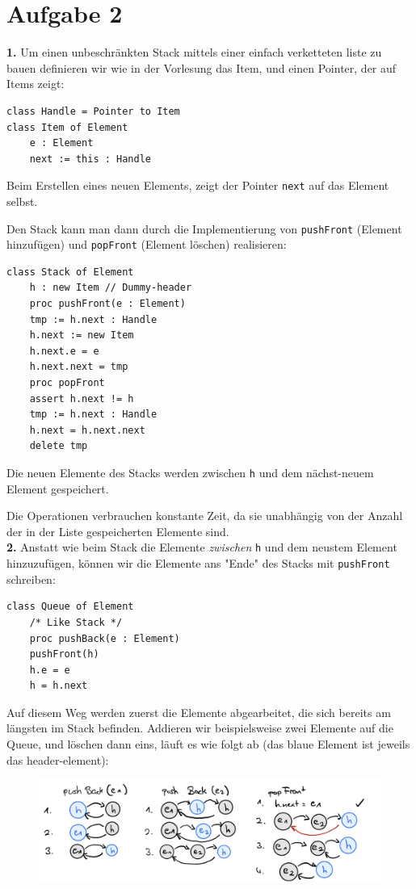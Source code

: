 \documentclass{article}
\begin{document}
\section*{Aufgabe 2}
\textbf{1.} Um einen unbeschränkten Stack mittels einer einfach verketteten liste zu bauen
definieren wir wie in der Vorlesung das Item, und einen Pointer, der auf Items zeigt:
\begin{lstlisting}
class Handle = Pointer to Item
class Item of Element
    e : Element
    next := this : Handle
\end{lstlisting}
Beim Erstellen eines neuen Elements, zeigt der Pointer \texttt{next} auf das Element
selbst.

Den Stack kann man dann durch die Implementierung von \texttt{pushFront} (Element
hinzufügen) und \texttt{popFront} (Element löschen) realisieren:
\begin{lstlisting}
class Stack of Element
    h : new Item // Dummy-header
    proc pushFront(e : Element)
	tmp := h.next : Handle
	h.next := new Item
	h.next.e = e 
	h.next.next = tmp
    proc popFront
	assert h.next != h
	tmp := h.next : Handle
	h.next = h.next.next
	delete tmp
\end{lstlisting}

Die neuen Elemente des Stacks werden zwischen \texttt{h} und dem nächst-neuem Element
gespeichert.

Die Operationen verbrauchen konstante Zeit, da sie unabhängig von der Anzahl der in
der Liste gespeicherten Elemente sind.\\

\textbf{2.} Anstatt wie beim Stack die Elemente \textit{zwischen} \texttt{h} und
dem neustem Element hinzuzufügen, können wir die Elemente ans "Ende" des Stacks
mit \texttt{pushFront} schreiben:
\begin{lstlisting}
class Queue of Element
    /* Like Stack */
    proc pushBack(e : Element)
	pushFront(h)
	h.e = e
	h = h.next
\end{lstlisting}
Auf diesem Weg werden zuerst die Elemente abgearbeitet, die sich bereits am längsten
im Stack befinden. Addieren wir beispielsweise zwei Elemente auf die Queue, und
löschen dann eins, läuft es wie folgt ab (das blaue Element ist jeweils das header-element):
\begin{figure}[H]
    \centering
    \includegraphics[width=.9\textwidth]{Queue.jpg}
\end{figure}
\end{document}
